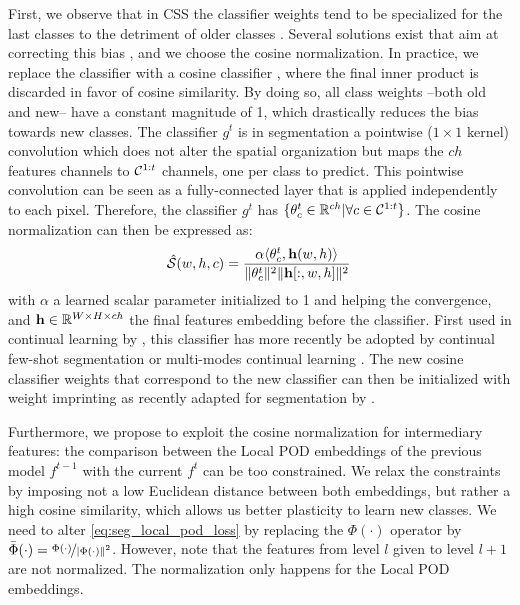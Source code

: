 First, we observe that in \ac{CSS} the classifier weights tend to be specialized for the last classes to
the detriment of older classes \citep{hou2019ucir}. Several solutions exist that aim at correcting
this bias
\citep{wu2019bias_correction,belouadah2019il2m,zhao2020weightalignement,luo2018cosine_classifier}, and
we choose the cosine normalization. In practice, we replace the classifier with a cosine classifier
\citep{luo2018cosine_classifier}, where the final inner product is discarded in favor of cosine
similarity. By doing so, all class weights --both old and new-- have a constant magnitude of 1,
which drastically reduces the bias towards new classes. The classifier $g^t$ is in segmentation a
pointwise ($1\times1$ kernel) convolution which does not alter the spatial organization but maps the
$ch$ features channels to $\mathcal{C}^{1:t}$ channels, one per class to predict. This pointwise
convolution can be seen as a fully-connected layer that is applied independently to each pixel.
Therefore, the classifier $g^t$ has $\{\theta_c^t \in \mathbb{R}^{ch} | \forall c \in \mathcal{C}^{1:t}\}$.
The cosine normalization can then be expressed as:
%
\begin{equation}
    \hat{\mathcal{S}}(w, h, c) = \frac{\alpha \langle \theta^t_c, \mathbf{h}(w, h) \rangle}{\Vert \theta^t_c \Vert^2 \Vert \mathbf{h}[:,w, h] \Vert^2}\,
    \label{eq:seg_cosine_classifier}
\end{equation}
%
\noindent with $\alpha$ a learned scalar parameter initialized to 1 and helping the convergence, and $\mathbf{h} \in
    \mathbb{R}^{W \times H \times ch}$ the final features embedding before the classifier. First
used in continual learning by \cite{hou2019ucir}, this classifier has more recently be adopted
by continual few-shot segmentation \citep{cermelli2020fewshotcontinualsegm} or multi-modes
continual learning \citep{douillard2020podnet}. The new cosine classifier weights that
correspond to the new classifier can then be initialized with weight imprinting
\citep{qi2018imprintedweights} as recently adapted for segmentation by
\cite{cermelli2020fewshotcontinualsegm}.

Furthermore, we propose to exploit the cosine normalization for intermediary features: the
comparison between the Local POD embeddings of the previous model $f^{t-1}$ with the current $f^t$
can be too constrained. We relax the constraints by imposing not a low Euclidean distance between
both embeddings, but rather a high cosine similarity, which allows us better plasticity to learn new
classes. We need to alter \autoref{eq:seg_local_pod_loss} by replacing the $\Phi(\cdot)$ operator by
$\bar{\Phi}(\cdot) = \nicefrac{\Phi(\cdot)}{\vert\Phi(\cdot)\Vert^2}$. However, note that the
features from level $l$ given to level $l+1$ are not normalized. The normalization only happens for
the Local POD embeddings.

